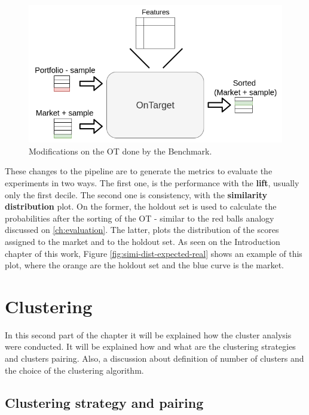 \begin{figure}[h]
   \centering
   \includegraphics[width=\linewidth]{fig/ch3-ot-benchmark-blocks.png}
   \caption{Modifications on the OT done by the Benchmark.}
   \label{fig:ot-benchmark-blocks}
\end{figure}

These changes to the pipeline are to generate the metrics to evaluate the experiments in two ways. The first one, is the performance with the \textbf{lift}, usually only the first decile. The second one is consistency, with the \textbf{similarity distribution} plot. On the former, the holdout set is used to calculate the probabilities after the sorting of the OT - similar to the red balls analogy discussed on \ref{ch:evaluation}. The latter, plots the distribution of the scores assigned to the market and to the holdout set. As seen on the Introduction chapter of this work, Figure \ref{fig:simi-dist-expected-real} shows an example of this plot, where the orange are the holdout set and the blue curve is the market.

\section{Clustering}

In this second part of the chapter it will be explained how the cluster analysis were conducted. It will be explained how and what are the clustering strategies and clusters pairing. Also, a discussion about definition of number of clusters and the choice of the clustering algorithm.

\subsection{Clustering strategy and pairing}

\newcommand{\fullNameClusterStrategyA}{Train on Portfolio}
\newcommand{\nameClusterStrategyA}{ToP}
\newcommand{\fullNameClusterStrategyB}{Train on All}
\newcommand{\nameClusterStrategyB}{ToA}
\newcommand{\fullNameClusterPairingA}{One versus One}
\newcommand{\nameClusterPairingA}{OvO}
\newcommand{\fullNameClusterPairingB}{One versus All}
\newcommand{\nameClusterPairingB}{OvA}


